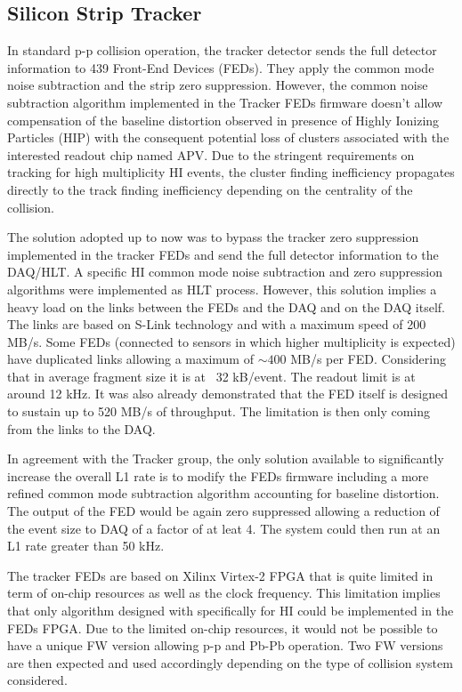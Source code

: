 \subsection{Silicon Strip Tracker\label{subsec:SiTracker}}
In standard p-p collision operation, the tracker detector sends the full detector information to 439 Front-End Devices (FEDs). They apply the common mode noise subtraction and the strip zero suppression. However, the common noise subtraction algorithm implemented in the Tracker FEDs firmware doesn't allow compensation of the baseline distortion observed in presence of Highly Ionizing Particles (HIP) with the consequent potential loss of clusters associated with the interested readout chip named APV. Due to the stringent requirements on tracking for high multiplicity HI events, the cluster finding inefficiency propagates directly to the track finding inefficiency depending on the centrality of the collision.  

The solution adopted up to now was to bypass the tracker zero suppression implemented in the tracker FEDs and send the full detector information to the DAQ/HLT. A specific HI common mode noise subtraction and zero suppression algorithms were implemented as HLT process. However, this solution implies a heavy load on the links between the FEDs and the DAQ and on the DAQ itself. The links are based on S-Link technology and with a maximum speed of 200 MB/s. Some FEDs (connected to sensors in which higher multiplicity is expected) have duplicated links allowing a maximum of $\sim 400$ MB/s per FED.  Considering that in average fragment size it is at ~32 kB/event. The readout limit is at around 12 kHz. It was also already demonstrated that the FED itself is designed to sustain up to 520 MB/s of throughput. The limitation is then only coming from the links to the DAQ. 

In agreement with the Tracker group, the only solution available to significantly increase the overall L1 rate is to modify the FEDs firmware including a more refined common mode subtraction algorithm accounting for baseline distortion. The output of the FED would be again zero suppressed allowing a reduction of the event size to DAQ of a factor of at leat 4. The system could then run at an L1 rate greater than 50 kHz. 

The tracker FEDs are based on Xilinx Virtex-2 FPGA that is quite limited in term of on-chip resources as well as the clock frequency. This limitation implies that only algorithm designed with specifically for HI could be implemented in the FEDs FPGA. Due to the limited on-chip resources, it would not be possible to have a unique FW version allowing p-p and Pb-Pb operation. Two FW versions are then expected and used accordingly depending on the type of collision system considered. 


